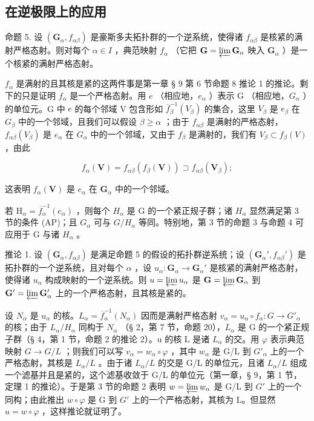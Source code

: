 \subsection{在逆极限上的应用}

命题 5. 设 \((\mathbf{G}_{\alpha}, f_{\alpha \beta})\) 是豪斯多夫拓扑群的一个逆系统，使得诸 \(f_{\alpha \beta}\) 是核紧的满射严格态射。则对每个 \(\alpha \in I\) ，典范映射 \(f_{\alpha}\) （它把 \(\mathbf{G} = \varprojlim \mathbf{G}_{\alpha}\) 映入 \(\mathbf{G}_{\alpha}\) ）是一个核紧的满射严格态射。

\(f_{\alpha}\) 是满射的且其核是紧的这两件事是第一章 § 9 第 6 节命题 8 推论 1 的推论。剩下的只是证明 \(f_{\alpha}\) 是一个严格态射。用 \(e\) （相应地，\(e_{\alpha}\) ）表示 G （相应地，\(G_{\alpha}\) ）的单位元。G 中 \(e\) 的每个邻域 V 包含形如 \(\overline{f}_{\beta}^{-1}(V_{\beta})\) 的集合，这里 \(V_{\beta}\) 是 \(e_{\beta}\) 在 \(G_{\beta}\) 中的一个邻域，且我们可以假设 \(\beta \geqslant \alpha\) ；由于 \(f_{\alpha \beta}\) 是满射的严格态射，\(f_{\alpha \beta}(V_{\beta})\) 是 \(e_{\alpha}\) 在 \(G_{\alpha}\) 中的一个邻域，又由于 \(f_{\beta}\) 是满射的，我们有 \(V_{\beta} \subset f_{\beta}(V)\) ，由此

\[
f _ {\alpha} (\mathbf {V}) = f _ {\alpha \beta} (f _ {\beta} (\mathbf {V})) \supset f _ {\alpha \beta} (\mathbf {V} _ {\beta});
\]

这表明 \(f_{\alpha}(\mathbf{V})\) 是 \(e_{\alpha}\) 在 \(\mathbf{G}_{\alpha}\) 中的一个邻域。

若 \(\mathrm{H}_{\alpha}=\overline{f}_{\alpha}^{-1}(e_{\alpha})\) ，则每个 \(H_{\alpha}\) 是 G 的一个紧正规子群；诸 \(H_{\alpha}\) 显然满足第 3 节的条件 (AP)；且 \(G_{\alpha}\) 可与 \(G/H_{\alpha}\) 等同。特别地，第 3 节的命题 3 与命题 4 可应用于 G 与诸 \(H_{\alpha}\) 。

推论 1. 设 \((\mathbf{G}_{\alpha}, f_{\alpha \beta})\) 是满足命题 5 的假设的拓扑群逆系统；设 \((\mathbf{G}_{\alpha}', f_{\alpha \beta}')\) 是拓扑群的一个逆系统，且对每个 \(\alpha\) ，设 \(u_{\alpha}: \mathbf{G}_{\alpha} \to \mathbf{G}_{\alpha}'\) 是核紧的满射严格态射，使得诸 \(u_{\alpha}\) 构成映射的一个逆系统。则 \(u = \varprojlim u_{\alpha}\) 是 \(\mathbf{G} = \varprojlim \mathbf{G}_{\alpha}\) 到 \(\mathbf{G}' = \varprojlim \mathbf{G}_{\alpha}'\) 上的一个严格态射，且其核是紧的。

设 \(N_{\alpha}\) 是 \(u_{\alpha}\) 的核。\(L_{\alpha} = \overline{f}_{\alpha}^{-1}(N_{\alpha})\) 因而是满射严格态射 \(v_{\alpha} = u_{\alpha} \circ f_{\alpha}: G \to G'_{\alpha}\) 的核；由于 \(L_{\alpha}/H_{\alpha}\) 同构于 \(N_{\alpha}\) （§ 2，第 7 节，命题 20），\(L_{\alpha}\) 是 G 的一个紧正规子群（§ 4，第 1 节，命题 2 的推论 2）。u 的核 L 是诸 \(L_{\alpha}\) 的交。用 \(\varphi\) 表示典范映射 \(G \to G/L\) ；则我们可以写 \(v_{\alpha} = w_{\alpha} \circ \varphi\) ，其中 \(w_{\alpha}\) 是 G/L 到 \(G'_{\alpha}\) 上的一个严格态射，其核是 \(L_{\alpha}/L\) 。由于诸 \(L_{\alpha}/L\) 的交是 G/L 的单位元，且诸 \(L_{\alpha}/L\) 组成一个滤基并且是紧的，这个滤基收敛于 G/L 的单位元（第一章，§ 9，第 1 节，定理 1 的推论）。于是第 3 节的命题 2 表明 \(w = \varprojlim w_{\alpha}\) 是 G/L 到 \(G'\) 上的一个同构；由此推出 \(w \circ \varphi\) 是 G 到 \(G'\) 上的一个严格态射，其核为 L。但显然 \(u = w \circ \varphi\) ，这样推论就证明了。


